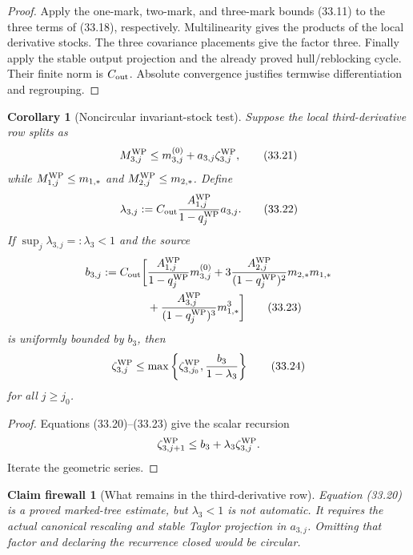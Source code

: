\documentclass[11pt,oneside]{book}
\newtheorem{corollary}[theorem]{Corollary}
\newtheorem{firewall}[theorem]{Claim firewall}
\theoremstyle{definition}
\theoremstyle{remark}
\begin{document}
\begin{proof}
Apply the one-mark, two-mark, and three-mark bounds (33.11) to the
three terms of (33.18), respectively.  Multilinearity gives the
products of the local derivative stocks.  The three covariance
placements give the factor three.  Finally apply the stable output
projection and the already proved hull/reblocking cycle.  Their
finite norm is \(C_{\rm out}\).  Absolute convergence justifies
termwise differentiation and regrouping.
\end{proof}

\begin{corollary}[Noncircular invariant-stock test]
\label{cor:e8v33-third-invariant}
Suppose the local third-derivative row splits as
\[
 M_{3,j}^{\rm WP}\leq m_{3,j}^{(0)}+
 a_{3,j}\zeta_{3,j}^{\rm WP},                                   \tag{33.21}
\]
while \(M_{1,j}^{\rm WP}\leq m_{1,*}\) and
\(M_{2,j}^{\rm WP}\leq m_{2,*}\).  Define
\[
 \lambda_{3,j}:=
 C_{\rm out}
 \frac{A_{1,j}^{\rm WP}}{1-q_j^{\rm WP}}a_{3,j}.                 \tag{33.22}
\]
If \(\sup_j\lambda_{3,j}=:\lambda_3<1\) and the source
\[
\begin{split}
 b_{3,j}:=C_{\rm out}\bigg[
 &\frac{A_{1,j}^{\rm WP}}{1-q_j^{\rm WP}}m_{3,j}^{(0)}
 +3\frac{A_{2,j}^{\rm WP}}{(1-q_j^{\rm WP})^2}m_{2,*}m_{1,*}\\
 &+\frac{A_{3,j}^{\rm WP}}{(1-q_j^{\rm WP})^3}m_{1,*}^3
 \bigg]                                                         \tag{33.23}
\end{split}
\]
is uniformly bounded by \(b_3\), then
\[
 \zeta_{3,j}^{\rm WP}\leq
 \max\left\{\zeta_{3,j_0}^{\rm WP},\frac{b_3}{1-\lambda_3}\right\}
                                                                    \tag{33.24}
\]
for all \(j\geq j_0\).
\end{corollary}

\begin{proof}
Equations (33.20)--(33.23) give the scalar recursion
\[
 \zeta_{3,j+1}^{\rm WP}\leq b_3+\lambda_3\zeta_{3,j}^{\rm WP}.
\]
Iterate the geometric series.
\end{proof}

\begin{firewall}[What remains in the third-derivative row]
\label{fire:e8v33-third-status}
Equation (33.20) is a proved marked-tree estimate, but
\(\lambda_3<1\) is not automatic.  It requires the actual canonical
rescaling and stable Taylor projection in \(a_{3,j}\).  Omitting that
factor and declaring the recurrence closed would be circular.
\end{firewall}
\end{document}
